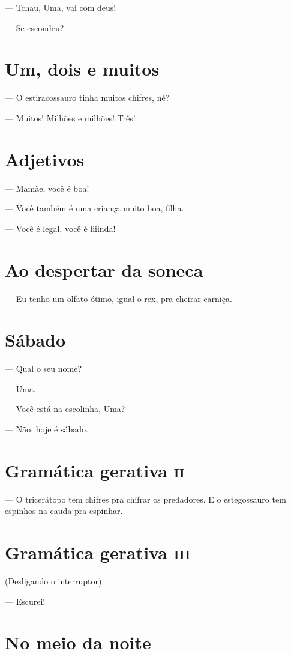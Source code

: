 — Tchau, Uma, vai com deus!

— Se escondeu?

\chapter{Um, dois e muitos}

— O estiracossauro tinha muitos chifres, né?

— Muitos! Milhões e milhões! Três!

\chapter{Adjetivos}

— Mamãe, você é boa!

— Você também é uma criança muito boa, filha.

— Você é legal, você é liiinda!

\chapter{Ao despertar da soneca}

— Eu tenho um olfato ótimo, igual o rex, pra cheirar carniça.

\chapter{Sábado}

— Qual o seu nome?

— Uma.

— Você está na escolinha, Uma?

— Não, hoje é sábado.

\chapter{Gramática gerativa \textsc{ii}}

— O tricerátopo tem chifres pra chifrar os predadores. E o estegossauro
tem espinhos na cauda pra espinhar.

\chapter{Gramática gerativa \textsc{iii}}

(Desligando o interruptor)

— Escurei!

\chapter{No meio da noite}


